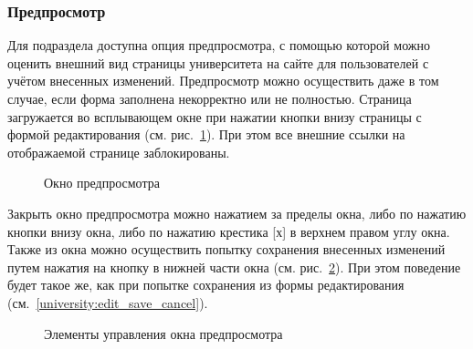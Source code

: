 	\subsubsection{Предпросмотр}\label{university:edit_preview_ch}
	Для подраздела  доступна опция предпросмотра, с помощью которой можно оценить внешний вид страницы университета на сайте для пользователей с учётом внесенных изменений. Предпросмотр можно осуществить даже в том случае, если форма заполнена некорректно или не полностью. Страница загружается во всплывающем окне при нажатии кнопки  внизу страницы с формой редактирования (см. рис.~\ref{university:edit_preview}). При этом все внешние ссылки на отображаемой странице заблокированы.
	
		\begin{figure}[H]
		\caption{Окно предпросмотра}
		\label{university:edit_preview}
		\end{figure}	

Закрыть окно предпросмотра можно нажатием за пределы окна, либо по нажатию кнопки  внизу окна, либо по нажатию крестика [х] в верхнем правом углу окна. Также из окна можно осуществить попытку сохранения внесенных изменений путем нажатия на кнопку  в нижней части окна (см. рис.~\ref{university:edit_preview_button}). При этом поведение будет такое же, как при попытке сохранения из формы редактирования (см.~\ref{university:edit_save_cancel}).

		\begin{figure}[H]
		\caption{Элементы управления окна предпросмотра}
		\label{university:edit_preview_button}
		\end{figure}	
		
